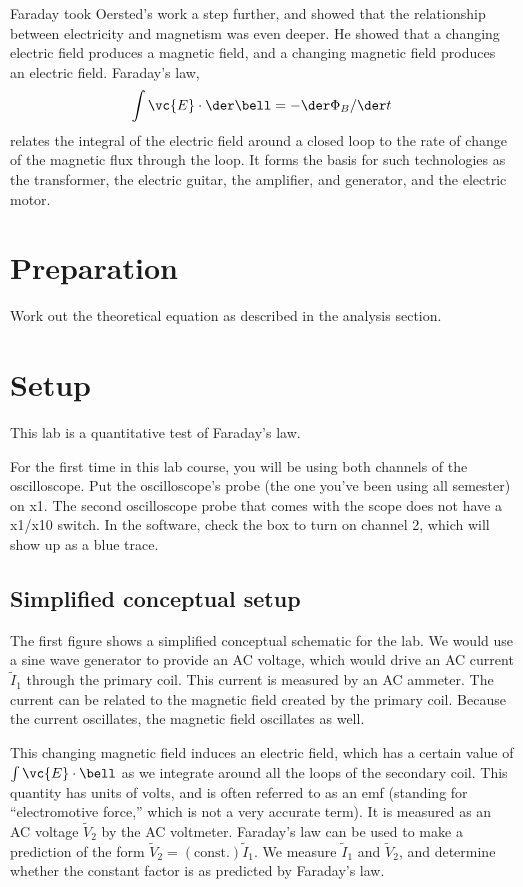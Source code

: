 Faraday took Oersted's work a step further, and showed that
the relationship between electricity and magnetism was even
deeper. He showed that a changing electric field produces a
magnetic field, and a changing magnetic field produces an
electric field. Faraday's law,
\begin{equation*}
      \int \vc{E}\cdot\der\bell  =  -\der\Phi_B/\der t  
\end{equation*}
relates the integral of the electric field around a
closed loop to the rate of change of the magnetic flux
through the loop. It forms the basis for such technologies
as the transformer, the electric guitar, the amplifier, and
generator, and the electric motor.

\section*{Preparation}

Work out the theoretical equation as described in the analysis section.

\section*{Setup}

This lab is a quantitative test of Faraday's
law. 

For the first time in this lab course, you will be using both channels
of the oscilloscope.
Put the oscilloscope's probe (the one you've been using all semester)
on x1.
The second oscilloscope probe that comes with the scope does not have
a x1/x10 switch. In the software, check the box to turn on channel 2,
which will show up as a blue trace.


\subsection*{Simplified conceptual setup}

The first figure shows a simplified conceptual schematic for the lab.
We would use a sine wave generator to provide an AC voltage, which
would drive an AC current $\tilde{I}_1$  through the primary coil. This current
is measured by an AC ammeter. The current can be related to the magnetic
field created by the primary coil. Because the current oscillates,
the magnetic field oscillates as well.


This changing magnetic field induces an electric field, which has
a certain value of $\int \vc{E}\cdot\bell$ as we integrate around
all the loops of the secondary coil. This quantity has units of
volts, and is often referred to as an emf (standing for ``electromotive
force,'' which is not a very accurate term). It is measured as an AC
voltage $\tilde{V}_2$ by the AC voltmeter. Faraday's law can be
used to make a prediction of the form $\tilde{V}_2=(\text{const.})\tilde{I}_1$.
We measure $\tilde{I}_1$ and $\tilde{V}_2$, and determine whether the constant
factor is as predicted by Faraday's law.

